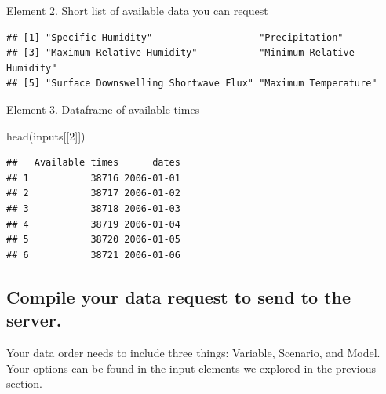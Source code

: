 \documentclass[
  paper=a4,
  ,captions=tableheading
]{scrartcl}
\newenvironment{Shaded}{\begin{snugshade}}{\end{snugshade}}
\newcommand{\DecValTok}[1]{\textcolor[rgb]{0.00,0.00,0.81}{#1}}
\newcommand{\FunctionTok}[1]{\textcolor[rgb]{0.00,0.00,0.00}{#1}}
\newcommand{\NormalTok}[1]{#1}
\newcommand{\SpecialCharTok}[1]{\textcolor[rgb]{0.00,0.00,0.00}{#1}}
\begin{document}
Element 2. Short list of available data you can request

\begin{Shaded}
\end{Shaded}

\begin{verbatim}
## [1] "Specific Humidity"                   "Precipitation"                      
## [3] "Maximum Relative Humidity"           "Minimum Relative Humidity"          
## [5] "Surface Downswelling Shortwave Flux" "Maximum Temperature"
\end{verbatim}

Element 3. Dataframe of available times

\begin{Shaded}
\begin{Highlighting}[]
\FunctionTok{head}\NormalTok{(inputs[[}\DecValTok{2}\NormalTok{]])}
\end{Highlighting}
\end{Shaded}

\begin{verbatim}
##   Available times      dates
## 1           38716 2006-01-01
## 2           38717 2006-01-02
## 3           38718 2006-01-03
## 4           38719 2006-01-04
## 5           38720 2006-01-05
## 6           38721 2006-01-06
\end{verbatim}

\hypertarget{compile-your-data-request-to-send-to-the-server.}{%
\subsection{Compile your data request to send to the
server.}\label{compile-your-data-request-to-send-to-the-server.}}

Your data order needs to include three things: Variable, Scenario, and
Model. Your options can be found in the input elements we explored in
the previous section.
\end{document}
